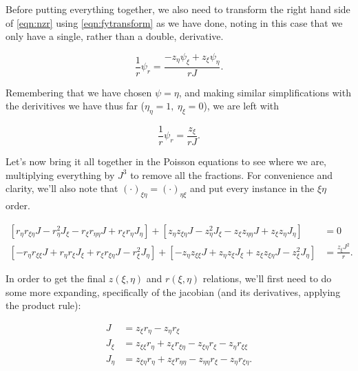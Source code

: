 Before putting everything together, we also need to transform the right hand side of \cref{eqn:nzr} using \cref{eqn:fytransform} as we have done, noting in this case that we only have a single, rather than a double, derivative.

\begin{equation}
	\frac{1}{r} \psi_r = \frac{-z_\eta \psi_\xi + z_\xi \psi_\eta}{r J}.
\end{equation}

\noindent Remembering that we have chosen \(\psi = \eta\), and making similar simplifications with the derivitives we have thus far (\(\eta_\eta = 1,~\eta_\xi=0\)), we are left with

\begin{equation}
	\frac{1}{r} \psi_r = \frac{z_\xi}{r J}.
\end{equation}

Let's now bring it all together in the Poisson equations to see where we are, multiplying everything by \(J^3\) to remove all the fractions.
%
For convenience and clarity, we'll also note that \((\cdot)_{\xi\eta} = (\cdot)_{\eta\xi}\) and put every instance in the \(\xi\eta\) order.

\begin{subequations}
	\begin{align}
        \label{eqn:poissontrans2a}
		\left[r_\eta r_{\xi\eta}J - r_\eta^2 J_\xi -  r_\xi r_{\eta\eta}J + r_\xi r_\eta J_\eta\right] + \left[z_\eta z_{\xi\eta}J - z_\eta^2 J_\xi -  z_\xi z_{\eta\eta}J + z_\xi z_\eta J_\eta \right] &= 0 \\
        \label{eqn:poissontrans2b}
		\left[-r_\eta r_{\xi\xi}J + r_\eta r_\xi J_\xi + r_\xi r_{\xi\eta}J - r_\xi^2 J_\eta\right] + \left[-z_\eta z_{\xi\xi}J + z_\eta z_\xi J_\xi + z_\xi z_{\xi\eta} J - z_\xi^2 J_\eta\right] &= \frac{z_\xi J^2}{r}.
	\end{align}
\end{subequations}

In order to get the final \(z(\xi,\eta)\) and \(r(\xi,\eta)\) relations, we'll first need to do some more expanding, specifically of the jacobian (and its derivatives, applying the product rule):

\begin{subequations}
	\begin{align}
		J &= z_\xi r_\eta - z_\eta r_\xi \\
		J_\xi &= z_{\xi\xi} r_\eta + z_\xi r_{\xi\eta} - z_{\xi\eta} r_\xi - z_\eta r_{\xi\xi} \\
		J_\eta &= z_{\xi\eta} r_\eta + z_\xi r_{\eta\eta} - z_{\eta\eta} r_\xi - z_\eta r_{\xi\eta}.
	\end{align}
\end{subequations}


